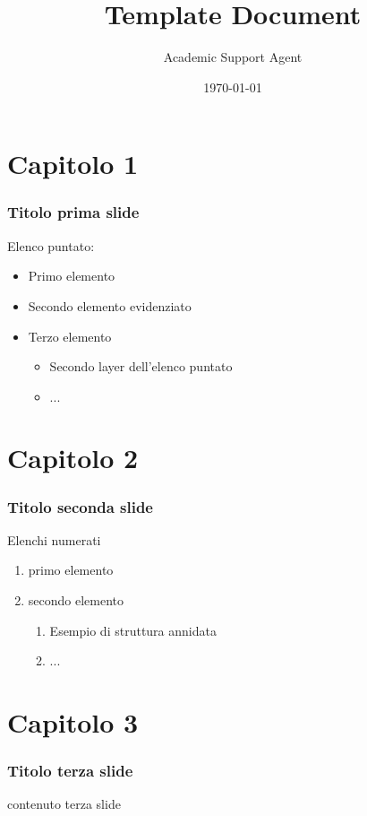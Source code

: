 \documentclass{article}
\title{Template Document}
\author{Academic Support Agent}
\date{\today}
\begin{document}
\maketitle

\begin{frame}
\setTitlestyleDissertation
\maketitle
\end{frame}


\section{Capitolo 1}
\begin{frame}
    \frametitle{Titolo prima slide}
    Elenco puntato: 
    \begin{itemize}
        \item Primo elemento
        \item<alert@1> Secondo elemento evidenziato 
        \item Terzo elemento
            \begin{itemize}
                \item Secondo layer dell'elenco puntato
                \item ... 
            \end{itemize}
    \end{itemize}
\end{frame}


\section{Capitolo 2}
\begin{frame}
    \frametitle{Titolo seconda slide}
    Elenchi numerati 
    \begin{enumerate}
        \item primo elemento 
        \item secondo elemento
            \begin{enumerate}
                \item Esempio di struttura annidata
                \item ...
            \end{enumerate}
    \end{enumerate}
\end{frame}




\section{Capitolo 3}
\begin{frame}
    \frametitle{Titolo terza slide}
    contenuto terza slide
\end{frame}
\end{document}
